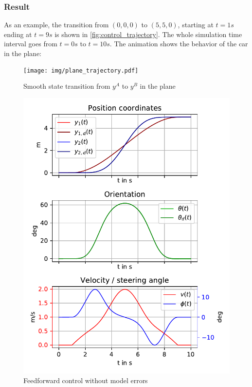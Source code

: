 \documentclass[a4paper,12pt,headinclude=true,headsepline,parskip=half,DIV=12]{scrartcl}
\begin{document}
\subsubsection{Result} \label{subsec:result:ff}
As an example, the transition from $(0, 0, 0)$ to $(5, 5, 0)$, starting at $t=1s$ ending at $t=9s$ is shown in \autoref{fig:control_trajectory}. The whole simulation time interval goes from $t=0s$ to $t=10s$.
The animation shows the behavior of the car in the plane:
\begin{figure}[ht]
  \centering
  \texttt{[image: img/plane\_trajectory.pdf]}
  \caption{Smooth state transition from $y^A$ to $y^B$ in the plane}
  \label{fig:plane_trajectory}
\end{figure}
\begin{figure}[ht]
  \centering
  \includegraphics[scale=1]{img/control_trajectory.pdf}
  \caption{Feedforward control without model errors}
  \label{fig:control_trajectory}
\end{figure}
\clearpage
\end{document}

